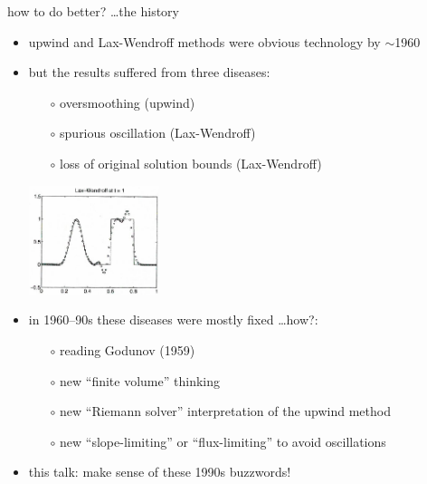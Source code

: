 \documentclass[10pt,dvipsnames,usepdftitle=false,
hyperref={pdftitle = {Finite volume methods},
    pdfauthor = {Ed Bueler}}]{beamer}
\begin{document}
\begin{frame}{how to do better? \dots the history}

\begin{itemize}
\item upwind and Lax-Wendroff methods were obvious technology by $\sim$1960
\item but the results suffered from three diseases:
    \begin{itemize}
    \item[$\circ$] \alert{oversmoothing} (upwind)
    \item[$\circ$] \alert{spurious oscillation} (Lax-Wendroff)
    \item[$\circ$] \alert{loss of original solution bounds} (Lax-Wendroff)
    \end{itemize}

\vspace{-15mm}

\hfill \includegraphics[width=0.3\textwidth]{figs/leveque6p1lw}

\bigskip
\item in 1960--90s these diseases were mostly fixed \dots how?:
    \begin{itemize}
    \item[$\circ$] reading Godunov (1959)
    \item[$\circ$] new ``finite volume'' thinking
    \item[$\circ$] new ``Riemann solver'' interpretation of the upwind method
    \item[$\circ$] new ``slope-limiting'' or ``flux-limiting'' to avoid oscillations
    \end{itemize}

\item this talk: make sense of these 1990s buzzwords!
\end{itemize}
\end{frame}
\end{document}
